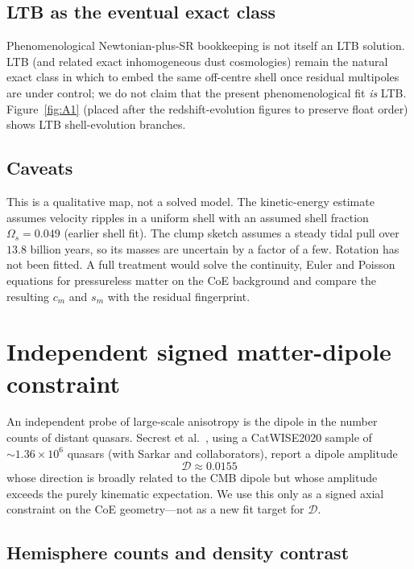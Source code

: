 \documentclass[11pt,a4paper]{article}
\begin{document}
\subsection{LTB as the eventual exact class}

Phenomenological Newtonian-plus-SR bookkeeping is not itself an LTB solution. LTB (and related exact inhomogeneous dust cosmologies) remain the natural exact class in which to embed the same off-centre shell once residual multipoles are under control; we do not claim that the present phenomenological fit \emph{is} LTB. Figure~\ref{fig:A1} (placed after the redshift-evolution figures to preserve float order) shows LTB shell-evolution branches.

\subsection{Caveats}

This is a qualitative map, not a solved model. The kinetic-energy estimate assumes velocity ripples in a uniform shell with an assumed shell fraction \(\Omega_{s}=0.049\) (earlier shell fit). The clump sketch assumes a steady tidal pull over \(13.8\) billion years, so its masses are uncertain by a factor of a few. Rotation has not been fitted. A full treatment would solve the continuity, Euler and Poisson equations for pressureless matter on the CoE background and compare the resulting \(c_{m}\) and \(s_{m}\) with the residual fingerprint.

\section{Independent signed matter-dipole constraint}
\label{sec:matterdipole}

An independent probe of large-scale anisotropy is the dipole in the number counts of distant quasars. Secrest et al.~\cite{secrest2021}, using a CatWISE2020 sample of \(\sim1.36\times10^{6}\) quasars (with Sarkar and collaborators), report a dipole amplitude
\begin{equation}
\mathcal{D}\approx0.0155
\end{equation}
whose direction is broadly related to the CMB dipole but whose amplitude exceeds the purely kinematic expectation. We use this only as a signed axial constraint on the CoE geometry---not as a new fit target for \(\mathcal{D}\).

\subsection{Hemisphere counts and density contrast}
\end{document}
